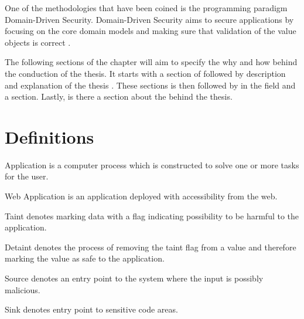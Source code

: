 One of the methodologies that have been coined is the programming paradigm Domain-Driven Security. Domain-Driven Security aims to secure applications by focusing on the core domain models and making sure that validation of the value objects is correct \parencite{Wilander2009, Johnsson2009}.

The following sections of the chapter will aim to specify the why and how behind the conduction of the thesis. It starts with a section of \textit{} followed by \textit{} description and explanation of the thesis \textit{}. These sections is then followed by \textit{} in the field and a \textit{} section. Lastly, is there a section about the \textit{} behind the thesis.


\section{Definitions}
\label{Definitions}
\begin{definition}{Application}
    is a computer process which is constructed to solve one or more tasks for the user.
    \\
\end{definition}

\begin{definition}{Web Application}
    is an application deployed with accessibility from the web.
    \\
\end{definition}

\begin{definition}{Taint}
    denotes marking data with a flag indicating possibility to be harmful to the application.
    \\
\end{definition}

\begin{definition}{Detaint}
    denotes the process of removing the taint flag from a value and therefore marking the value as safe to the application.
    \\
\end{definition}

\begin{definition}{Source}
    denotes an entry point to the system where the input is possibly malicious.
    \\
\end{definition}

\begin{definition}{Sink}
    denotes entry point to sensitive code areas.
    \\
\end{definition}

